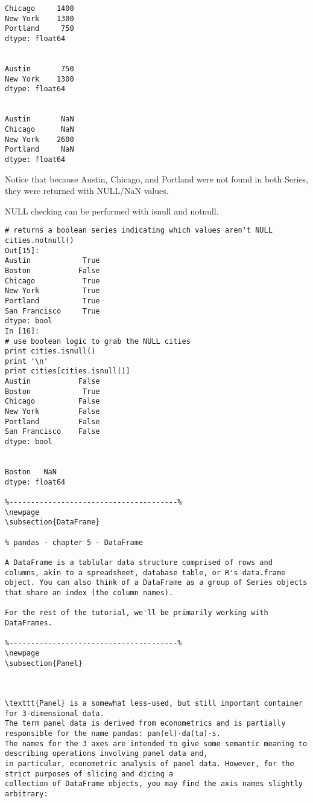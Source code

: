 \documentclass[main.tex]{subfiles}
\begin{document}
\begin{verbatim}
Chicago     1400
New York    1300
Portland     750
dtype: float64


Austin       750
New York    1300
dtype: float64


Austin       NaN
Chicago      NaN
New York    2600
Portland     NaN
dtype: float64
\end{verbatim}

Notice that because Austin, Chicago, and Portland were not found in both Series, they were returned with NULL/NaN values.

NULL checking can be performed with isnull and notnull.
\begin{framed}
\begin{verbatim}
# returns a boolean series indicating which values aren't NULL
cities.notnull()
Out[15]:
Austin            True
Boston           False
Chicago           True
New York          True
Portland          True
San Francisco     True
dtype: bool
In [16]:
# use boolean logic to grab the NULL cities
print cities.isnull()
print '\n'
print cities[cities.isnull()]
Austin           False
Boston            True
Chicago          False
New York         False
Portland         False
San Francisco    False
dtype: bool


Boston   NaN
dtype: float64

%---------------------------------------%
\newpage
\subsection{DataFrame}

% pandas - chapter 5 - DataFrame

A DataFrame is a tablular data structure comprised of rows and columns, akin to a spreadsheet, database table, or R's data.frame object. You can also think of a DataFrame as a group of Series objects that share an index (the column names).

For the rest of the tutorial, we'll be primarily working with DataFrames.

%---------------------------------------%
\newpage
\subsection{Panel}


 
\texttt{Panel} is a somewhat less-used, but still important container for 3-dimensional data. 
The term panel data is derived from econometrics and is partially responsible for the name pandas: pan(el)-da(ta)-s. 
The names for the 3 axes are intended to give some semantic meaning to describing operations involving panel data and, 
in particular, econometric analysis of panel data. However, for the strict purposes of slicing and dicing a 
collection of DataFrame objects, you may find the axis names slightly arbitrary:
 

\end{verbatim}
\end{framed}
\end{document}
